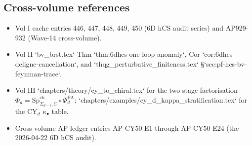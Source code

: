 \subsection*{Cross-volume references}

\begin{itemize}
\item Vol I cache entries 446, 447, 448, 449, 450 (6D hCS audit
series) and AP929-932 (Wave-14 cross-volume).
\item Vol II `bv_brst.tex` Thm `thm:6dhcs-one-loop-anomaly`, Cor
`cor:6dhcs-deligne-cancellation`, and
`thqg_perturbative_finiteness.tex` §`sec:pf-hcs-bv-feynman-trace`.
\item Vol III `chapters/theory/cy_to_chiral.tex` for the two-stage
factorisation $\Phi_d = \mathrm{Sp}^{\mathrm{ch}}_{\Sigma_{d-1}, C}
\circ \Phi^{\mathrm{FA}}_d$; `chapters/examples/cy_d_kappa_stratification.tex`
for the CY$_d$ $\kappa_\bullet$ table.
\item Cross-volume AP ledger entries AP-CY50-E1 through AP-CY50-E24
(the 2026-04-22 6D hCS audit).
\end{itemize}

